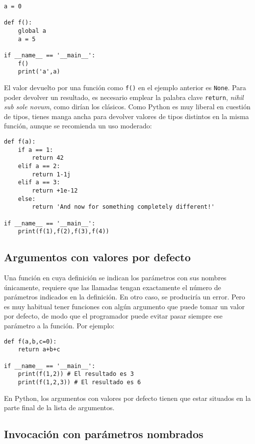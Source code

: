 \begin{lstlisting}
a = 0

def f():
    global a
    a = 5

if __name__ == '__main__':
    f()
    print('a',a)
\end{lstlisting}

El valor devuelto por una función como \texttt{f()} en el ejemplo anterior es \texttt{None}. Para poder devolver un resultado, es necesario emplear la palabra clave \texttt{return}, \emph{nihil sub sole novum}, como dirían los clásicos. Como Python es muy liberal en cuestión de tipos, tienes manga ancha para devolver valores de tipos distintos en la misma función, aunque se recomienda un uso moderado:

\begin{lstlisting}
def f(a):
    if a == 1:
        return 42
    elif a == 2:
        return 1-1j
    elif a == 3:
        return +1e-12
    else:
        return 'And now for something completely different!'

if __name__ == '__main__':
    print(f(1),f(2),f(3),f(4))
\end{lstlisting}


\subsection{Argumentos con valores por defecto}

Una función en cuya definición se indican los parámetros con sus nombres únicamente, requiere que las llamadas tengan exactamente el número de parámetros indicados en la definición. En otro caso, se produciría un error. Pero es muy habitual tener funciones con algún argumento que puede tomar un valor por defecto, de modo que el programador puede evitar pasar siempre ese parámetro a la función. Por ejemplo:

\begin{lstlisting}
def f(a,b,c=0):
    return a+b+c

if __name__ == '__main__':
    print(f(1,2)) # El resultado es 3
    print(f(1,2,3)) # El resultado es 6
\end{lstlisting}

En Python, los argumentos con valores por defecto tienen que estar situados en la parte final de la lista de argumentos. 

\subsection{Invocación con parámetros nombrados}

